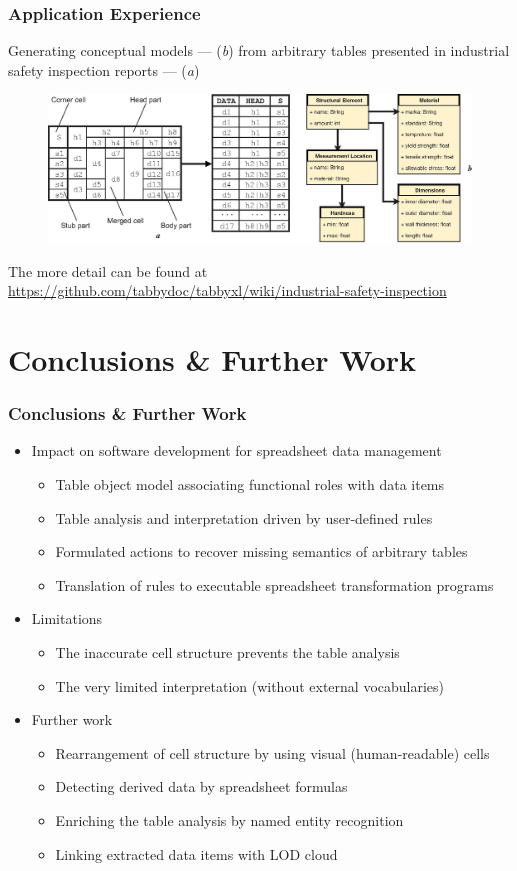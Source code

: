 \documentclass{beamer}
\begin{document}
\begin{frame}
\frametitle{Application Experience}
Generating conceptual models --- (\textit{b}) from arbitrary tables presented in industrial safety inspection reports --- (\textit{a})
\begin{figure}
\includegraphics[width=1\linewidth]{application2}
\end{figure}
\tiny{The more detail can be found at \url{https://github.com/tabbydoc/tabbyxl/wiki/industrial-safety-inspection}}
\end{frame}

\section{Conclusions \& Further Work}

\begin{frame}
\frametitle{Conclusions \& Further Work}

\begin{itemize}
\item Impact on software development for spreadsheet data management
\begin{itemize}
\item Table object model associating functional roles with data items
\item Table analysis and interpretation driven by user-defined rules
\item Formulated actions to recover missing semantics of arbitrary tables
\item Translation of rules to executable spreadsheet transformation programs
\end{itemize}
\medskip
\item Limitations
\begin{itemize}
\item The inaccurate cell structure prevents the table analysis
\item The very limited interpretation (without external vocabularies)
\end{itemize}
\medskip
\item Further work
\begin{itemize}
\item Rearrangement of cell structure by using visual (human-readable) cells
\item Detecting derived data by spreadsheet formulas
\item Enriching the table analysis by named entity recognition
\item Linking extracted data items with LOD cloud
\end{itemize}
\end{itemize}

\end{frame}
\end{document}
